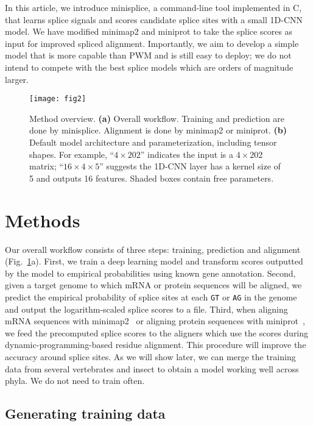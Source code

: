\documentclass[webpdf,contemporary,large,namedate]{oup-authoring-template}%
\begin{document}
In this article, we introduce minisplice, a command-line tool implemented in C,
that learns splice signals and scores candidate splice sites with a small 1D-CNN model.
We have modified minimap2 and miniprot to take the splice scores as input for improved spliced alignment.
Importantly, we aim to develop a simple model that is more capable than PWM and is still easy to deploy;
we do not intend to compete with the best splice models which are orders of magnitude larger.

\begin{figure}[tb]
\texttt{[image: fig2]}
\caption{Method overview. {\bf (a)} Overall workflow.
Training and prediction are done by minisplice.
Alignment is done by minimap2 or miniprot.
{\bf (b)} Default model architecture and parameterization, including tensor shapes.
For example, ``$4\times202$'' indicates the input is a $4\times202$ matrix;
``$16\times4\times5$'' suggests the 1D-CNN layer has a kernel size of 5 and outputs 16 features.
Shaded boxes contain free parameters.}\label{fig:wf}
\end{figure}

\section{Methods}

Our overall workflow consists of three steps: training, prediction and alignment (Fig.~\ref{fig:wf}a).
First, we train a deep learning model and transform scores outputted by the model
to empirical probabilities using known gene annotation.
Second, given a target genome to which mRNA or protein sequences will be aligned,
we predict the empirical probability of splice sites at each {\tt GT} or {\tt AG} in the genome
and output the logarithm-scaled splice scores to a file.
Third, when aligning mRNA sequences with minimap2~\citep{Li:2018ab} or aligning protein sequences with miniprot~\citep{Li:2023ab},
we feed the precomputed splice scores to the aligners which use the scores during dynamic-programming-based residue alignment.
This procedure will improve the accuracy around splice sites.
As we will show later, we can merge the training data from several vertebrates and insect
to obtain a model working well across phyla.
We do not need to train often.

\subsection{Generating training data}
\end{document}
